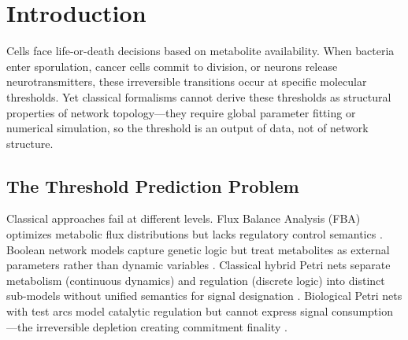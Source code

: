 \documentclass[10pt,letterpaper]{article}
\begin{document}
\section{Introduction}

Cells face life-or-death decisions based on metabolite availability. When bacteria enter sporulation, cancer cells commit to division, or neurons release neurotransmitters, these irreversible transitions occur at specific molecular thresholds. Yet classical formalisms cannot derive these thresholds as structural properties of network topology---they require global parameter fitting or numerical simulation, so the threshold is an output of data, not of network structure.

\subsection{The Threshold Prediction Problem}
Classical approaches fail at different levels. Flux Balance Analysis (FBA) optimizes metabolic flux distributions but lacks regulatory control semantics \cite{orth2010}. Boolean network models capture genetic logic but treat metabolites as external parameters rather than dynamic variables \cite{kauffman1969}. Classical hybrid Petri nets separate metabolism (continuous dynamics) and regulation (discrete logic) into distinct sub-models without unified semantics for signal designation \cite{liu2013,alla1998}. Biological Petri nets \cite{petri1962,murata1989,reddy1993petri} with test arcs model catalytic regulation but cannot express signal consumption---the irreversible depletion creating commitment finality \cite{heiner2008,chaouiya2007petri}.
\end{document}
